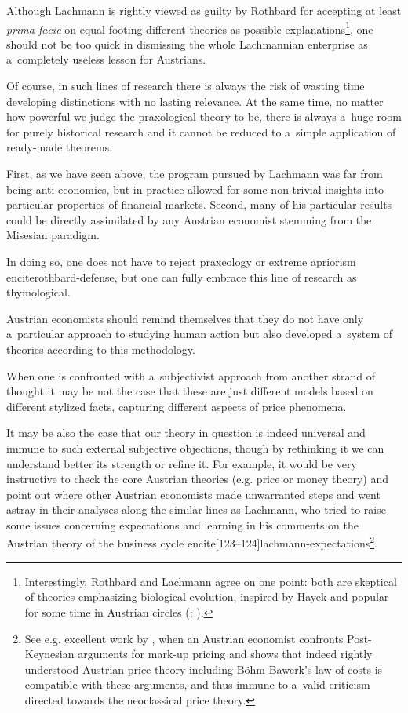 {Although Lachmann is rightly viewed as guilty by Rothbard for accepting at least \emph{prima facie} on equal footing different theories as possible explanations\footnote{Interestingly, Rothbard and Lachmann agree on one point: both are skeptical of theories emphasizing biological evolution, inspired by Hayek and popular for some time in Austrian circles (\cite[81]{rothbard-present}; \cite[Lachmann quoted in][26]{dekker-lachmann}).}, one should not be too quick in dismissing the whole Lachmannian enterprise as a~completely useless lesson for Austrians.

Of course, in such lines of research there is always the risk of wasting time developing distinctions with no lasting relevance. At the same time, no matter how powerful we judge the praxological theory to be, there is always a~huge room for purely historical research and it cannot be reduced to a~simple application of ready-made theorems.



First, as we have seen above, the program pursued by Lachmann was far from being anti-economics, but in practice allowed for some non-trivial insights into particular properties of financial markets. Second, many of his particular results could be directly assimilated by any Austrian economist stemming from the Misesian paradigm.

In doing so, one does not have to reject praxeology or extreme apriorism encite{rothbard-defense}, but one can fully embrace this line of research as thymological.



Austrian economists should remind themselves that they do not have only a~particular approach to studying human action but also developed a~system of theories according to this methodology.

When one is confronted with a~subjectivist approach from another strand of thought it may be not the case that these are just different models based on different stylized facts, capturing different aspects of price phenomena.

It may be also the case that our theory in question is indeed universal and immune to such external subjective objections, though by rethinking it we can understand better its strength or refine it. For example, it would be very instructive to check the core Austrian theories (e.g. price or money theory) and point out where other Austrian economists made unwarranted steps and went astray in their analyses along the similar lines as Lachmann, who tried to raise some issues concerning expectations and learning in his comments on the Austrian theory of the business cycle encite[123--124]{lachmann-expectations}\footnote{See e.g. excellent work by \textcite{machaj-postkeynesian}, when an Austrian economist confronts Post-Keynesian arguments for mark-up pricing and shows that indeed rightly understood Austrian price theory including B\"ohm-Bawerk's law of costs is compatible with these arguments, and thus immune to a~valid criticism directed towards the neoclassical price theory.}.



}

